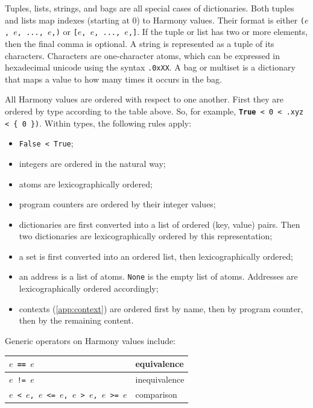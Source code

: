 \documentclass{report}
\begin{document}
Tuples, lists, strings, and bags are all special cases of dictionaries.
Both tuples and lists map indexes (starting at 0) to Harmony values.
Their format is either \texttt{($e$, $e$, ..., $e$,)} or
\texttt{[$e$, $e$, ..., $e$,]}.
If the tuple or list has two or more elements, then the final comma
is optional.
A string is represented as a tuple of its characters.
Characters are one-character atoms, which can be expressed
in hexadecimal unicode using the syntax \texttt{.0xXX}.
A bag or multiset is a dictionary that maps a value to how many
times it occurs in the bag.

All Harmony values are ordered with respect to one another.  First they
are ordered by type according to the table above.
So, for example, \texttt{\textbf{True} < 0 < .xyz < \{ 0 \})}.
Within types, the following rules apply:

\begin{itemize}
\item \texttt{False < True};
\item integers are ordered in the natural way;
\item atoms are lexicographically ordered;
\item program counters are ordered by their integer values;
\item dictionaries are first converted into a list of ordered (key, value)
pairs.  Then two dictionaries are lexicographically ordered by this
representation;
\item a set is first converted into an ordered list, then lexicographically
ordered;
\item an address is a list of atoms.  \texttt{None} is the empty list of atoms.
Addresses are lexicographically ordered accordingly;
\item contexts (\autoref{app:context}) are ordered first by name, then by program counter, then by the remaining content.
\end{itemize}

Generic operators on Harmony values include:

\begin{center}
\begin{tabular}{|l|l|}
\hline
\texttt{$e$ == $e$} & equivalence \\
\hline
\texttt{$e$ != $e$} & inequivalence \\
\hline
\texttt{$e$ < $e$, $e$ <= $e$, $e$ > $e$, $e$ >= $e$} & comparison\\
\hline
\end{tabular}
\end{center}
\end{document}
